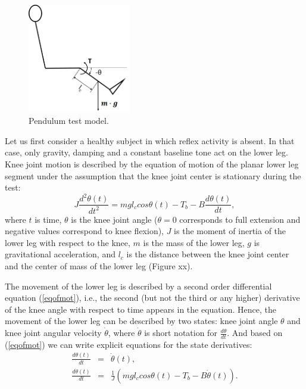 \documentclass[
a4paper, %
11pt, %
onecolumn, %
openright, %
]{memoir}
\begin{document}
\begin{figure}
  \begin{center}
    \includegraphics[width=0.4\textwidth]{Figure1.jpg}
  \end{center}
  \caption{Pendulum test model.}
  \label{Fig:model}
\end{figure}

Let us first consider a healthy subject in which reflex activity is absent. In that case, only gravity, damping and a constant baseline tone act on the lower leg. Knee joint motion is described by the equation of motion of the planar lower leg segment under the assumption that the knee joint center is stationary during the test:
\begin{equation}
J \frac{d^2\theta(t)}{dt^2} = m g l_c cos\theta(t) - T_b - B \frac{d\theta(t)}{dt},
\label{eqofmot}
\end{equation}
where $t$ is time, $\theta$ is the knee joint angle ($\theta = 0$ corresponds to full extension and negative values correspond to knee flexion), $J$ is the moment of inertia of the lower leg with respect to the knee, $m$ is the mass of the lower leg, $g$ is gravitational acceleration, and $l_c$ is the distance between the knee joint center and the center of mass of the lower leg (Figure xx). 

The movement of the lower leg is described by a second order differential equation (\ref{eqofmot}), i.e., the second (but not the third or any higher) derivative of the knee angle with respect to time appears in the equation. Hence, the movement of the lower leg can be described by two states: knee joint angle $\theta$ and knee joint angular velocity $\dot{\theta}$, where $\dot{\theta}$ is short notation for $\frac{d\theta}{dt}$. And based on (\ref{eqofmot}) we can write explicit equations for the state derivatives:
\begin{eqnarray}
\frac{d\theta(t)}{dt} & = & \dot{\theta}(t), \label{eqofmot1}\\
\frac{d \dot{\theta}(t)}{dt} & = &\frac{1}{J} \left( m g l_c cos\theta(t) - T_b - B \dot{\theta}(t) \right).
\label{eqofmot2}
\end{eqnarray}
\end{document}
